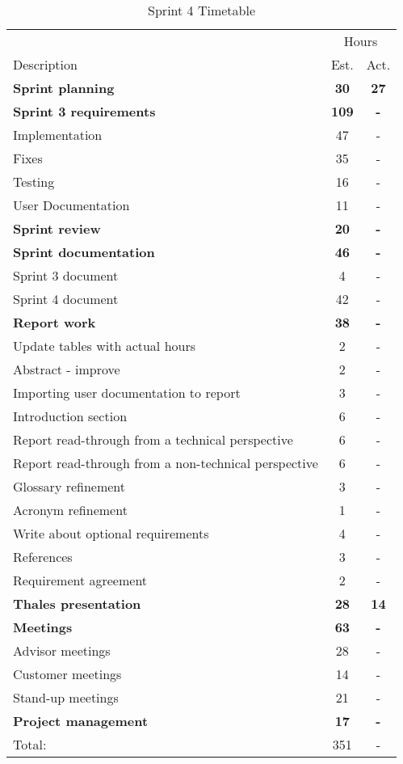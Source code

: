 \begin{table}[!htb] \small \center
\caption{Sprint 4 Timetable\label{tab:sprint4time}}
\begin{tabularx}{\textwidth}{X c c}
	\toprule
	& \multicolumn{2}{c}{Hours} \\
	\cmidrule(r){2-3}
	Description & Est. & Act. \\
	\midrule
	\textbf{Sprint planning} & \textbf{30} & \textbf{27} \\
	\addlinespace
	\textbf{Sprint 3 requirements} & \textbf{109} & \textbf{-} \\
	Implementation & 47 & - \\
	Fixes & 35 & - \\
	Testing & 16 & - \\
	User Documentation & 11 & - \\
	\addlinespace
	\textbf{Sprint review} & \textbf{20} & \textbf{-} \\
	\addlinespace
	\textbf{Sprint documentation} & \textbf{46} & \textbf{-} \\
	Sprint 3 document & 4 & - \\
	Sprint 4 document & 42 & - \\
	\addlinespace
	\textbf{Report work} & \textbf{38} & \textbf{-} \\
	Update tables with actual hours & 2 & - \\
	Abstract - improve & 2 & -\\
	Importing user documentation to report & 3 & -\\
	Introduction section & 6 & -\\
	Report read-through from a technical perspective & 6 & -\\
	Report read-through from a non-technical perspective & 6 & -\\
	Glossary refinement & 3 & -\\
	Acronym refinement & 1 & -\\
	Write about optional requirements & 4 & -\\
	References & 3 & -\\
	Requirement agreement & 2 & -\\
	\addlinespace
	\textbf{Thales presentation} & \textbf{28} & \textbf{14} \\
	\addlinespace
	\textbf{Meetings} & \textbf{63} & \textbf{-} \\
	Advisor meetings & 28 & - \\
	Customer meetings & 14 & - \\
	Stand-up meetings & 21 & - \\
	\addlinespace
	\textbf{Project management} & \textbf{17} & \textbf{-} \\
	\midrule
	Total: & 351 & - \\
	\bottomrule
\end{tabularx}
\end{table}



